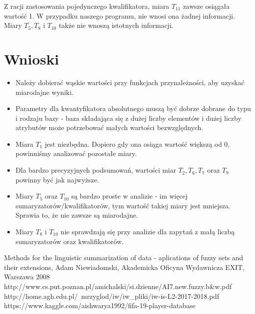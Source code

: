 \documentclass{classrep}
\begin{document}
Z racji zastosowania pojedynczego kwalifikatora, miara $T_{11}$ zawsze osiągała wartość 1. W przypadku naszego programu, nie wnosi ona żadnej informacji. Miary $T_5, T_8$ i $T_{10}$ także nie wnoszą istotnych informacji.


\section{Wnioski}
\begin{itemize}
	\item Należy dobierać wąskie wartości przy funkcjach przynależności, aby uzyskać miarodajne wyniki.
	\item Parametry dla kwantyfikatora absolutnego muszą być dobrze dobrane do typu i rodzaju bazy - baza składająca się z dużej liczby elementów i dużej liczby atrybutów może potrzebować małych wartości bezwzględnych.
	\item Miara $T_1$ jest niezbędna. Dopiero gdy ona osiąga wartość większą od 0, powinniśmy analizować pozostałe miary.
	\item Dla bardzo precyzyjnych podsumowań, wartości miar $T_2, T_6, T_7$ oraz $T_9$ powinny być jak najwyższe.
	\item Miary $T_5$ oraz $T_{10}$ są bardzo proste w analizie - im więcej sumaryzatorów/kwalifikatorów, tym wartość takiej miary jest mniejsza. Sprawia to, że nie zawsze są miarodajne.
	\item Miary $T_8$ i $T_{10}$ nie sprawdzają się przy analizie dla zapytań z małą liczbą sumaryzatorów oraz kwalifikatorów.  
\end{itemize}

	

\begin{thebibliography}{}
Methods for the linguistic summarization of data - aplications of fuzzy sets and their extensions, Adam Niewiadomski, Akademicka Oficyna Wydawnicza EXIT, Warszawa 2008
http://www.cs.put.poznan.pl/amichalski/si.dzienne/AI7.new.fuzzy.b\&w.pdf
http://home.agh.edu.pl/~mrzyglod/iw/iw\_pliki/iw-is-L2-2017-2018.pdf
https://www.kaggle.com/aishwarya1992/fifa-19-player-database
\end{thebibliography}
\end{document}
